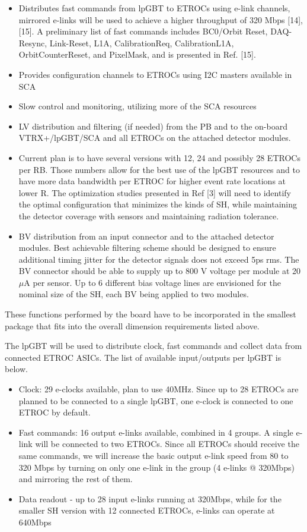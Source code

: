\documentclass[11pt]{article}
\begin{document}
\begin{itemize}
  \item Distributes fast commands from lpGBT to ETROCs using e-link channels, mirrored e-links will be used to achieve a higher throughput of 320 Mbps [14], [15]. A preliminary list of fast commands includes BC0/Orbit Reset, DAQ-Resync, Link-Reset, L1A, CalibrationReq, CalibrationL1A, OrbitCounterReset, and PixelMask, and is presented in Ref. [15].
  \item Provides configuration channels to ETROCs using I2C masters available in SCA
  \item Slow control and monitoring, utilizing more of the SCA resources
  \item LV distribution and filtering (if needed) from the PB and to the on-board VTRX+/lpGBT/SCA and all ETROCs on the attached detector modules.
  \item Current plan is to have several versions with 12, 24 and possibly 28 ETROCs per RB. Those numbers allow for the best use of the lpGBT resources and to have more data bandwidth per ETROC for higher event rate locations at lower R. The optimization studies presented in Ref [3] will need to identify the optimal configuration that minimizes the kinds of SH, while maintaining the detector coverage with sensors and maintaining radiation tolerance.
  \item BV distribution from an input connector and to the attached detector modules. Best achievable filtering scheme should be designed to ensure additional timing jitter for the detector signals does not exceed 5ps rms. The BV connector should be able to supply up to 800 V voltage per module at 20 $\mu$A per sensor. Up to 6 different bias voltage lines are envisioned for the nominal size of the SH, each BV being applied to two modules.
\end{itemize}

These functions performed by the board have to be incorporated in the smallest package that fits into the overall dimension requirements listed above.

The lpGBT will be used to distribute clock, fast commands and collect data from connected ETROC ASICs. The list of available input/outputs per lpGBT is below.

\begin{itemize}
  \item Clock: 29 e-clocks available, plan to use 40MHz. Since up to 28 ETROCs are planned to be connected to a single lpGBT, one e-clock is connected to one ETROC by default.
  \item Fast commands: 16 output e-links available, combined in 4 groups. A single e-link will be connected to two ETROCs. Since all ETROCs should receive the same commands, we will increase the basic output e-link speed from 80 to 320 Mbps by turning on only one e-link in the group (4 e-links @ 320Mbps) and mirroring the rest of them.
  \item Data readout - up to 28 input e-links running at 320Mbps, while for the smaller SH version with 12 connected ETROCs, e-links can operate at 640Mbps
\end{itemize}
\end{document}
